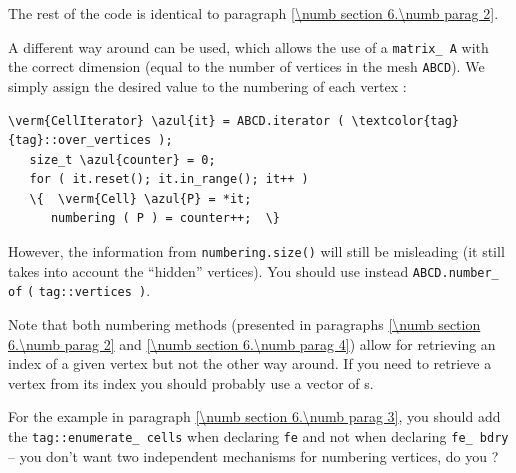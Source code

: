 The rest of the code is identical to paragraph \ref{\numb section 6.\numb parag 2}.

A different way around can be used, which allows the use of a {\small\tt matrix\_\,A}
with the correct dimension (equal to the number of vertices in the mesh {\small\tt ABCD}).
We simply assign the desired value to the numbering of each vertex :

\begin{Verbatim}[commandchars=\\\{\},formatcom=\small\tt,frame=single,
   rulecolor=\color{coment},baselinestretch=0.94,framesep=2mm          ]
   \verm{CellIterator} \azul{it} = ABCD.iterator ( \textcolor{tag}{tag}::over_vertices );
   size_t \azul{counter} = 0;
   for ( it.reset(); it.in_range(); it++ )
   \{  \verm{Cell} \azul{P} = *it;
      numbering ( P ) = counter++;  \}
\end{Verbatim}

However, the information from {\small\tt numbering.size()} will still be misleading
(it still takes into account the ``hidden'' vertices).
You should use instead {\small\tt ABCD.number\_\,of} {\small\tt} {\small\tt (}
{\small\tt \textcolor{tag}{tag}::vertices )}.

Note that both numbering methods (presented in paragraphs \ref{\numb section 6.\numb parag 2}
and \ref{\numb section 6.\numb parag 4}) allow for retrieving
an index of a given vertex but not the other way around.
If you need to retrieve a vertex from its index you should probably use 
a vector of {\small\tt{}}s.

For the example in paragraph \ref{\numb section 6.\numb parag 3}, you should add the
{\small\tt\textcolor{tag}{tag}::enumerate\_\,cells} when declaring {\small\tt fe} and not when
declaring {\small\tt fe\_\,bdry} -- you don't want two independent mechanisms for numbering
vertices, do you ?
